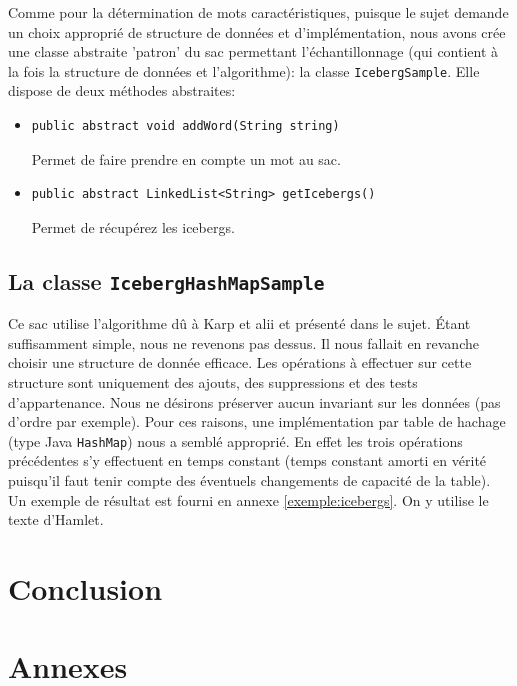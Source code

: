 \documentclass[12pt,a4paper,titlepage]{article}
\newcommand{\class}[1]{\texttt{#1}}
\begin{document}
Comme pour la détermination de mots caractéristiques, puisque le sujet demande un choix approprié de structure de données et d'implémentation, nous avons crée une classe abstraite 'patron' du sac permettant l'échantillonnage (qui contient à la fois la structure de données et l'algorithme): la classe \class{IcebergSample}. Elle dispose de deux méthodes abstraites:

\begin{itemize}
\item \begin{lstlisting}
public abstract void addWord(String string)
\end{lstlisting}
Permet de faire prendre en compte un mot au sac.

\item \begin{lstlisting}
public abstract LinkedList<String> getIcebergs()
\end{lstlisting}
Permet de récupérez les icebergs.
\end{itemize}

\subsection{La classe \class{IcebergHashMapSample}}

Ce sac utilise l'algorithme dû à Karp et alii et présenté dans le sujet. Étant suffisamment simple, nous ne revenons pas dessus. Il nous fallait en revanche choisir une structure de donnée efficace. Les opérations à effectuer sur cette structure sont uniquement des ajouts, des suppressions et des tests d'appartenance. Nous ne désirons préserver aucun invariant sur les données (pas d'ordre par exemple). Pour ces raisons, une implémentation par table de hachage (type Java \class{HashMap}) nous a semblé approprié. En effet les trois opérations précédentes s'y effectuent en temps constant (temps constant amorti en vérité puisqu'il faut tenir compte des éventuels changements de capacité de la table).\\

Un exemple de résultat est fourni en annexe \ref{exemple:icebergs}. On y utilise le texte d'Hamlet.

\newpage
\section*{Conclusion}


\newpage
\section*{Annexes}
 
\end{document}
